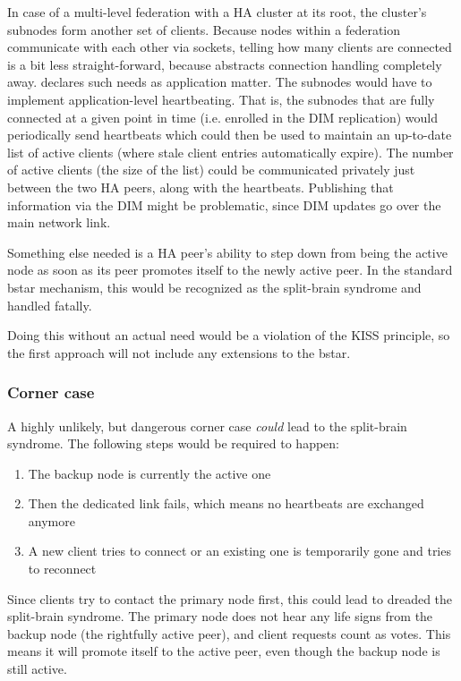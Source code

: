 In case of a multi-level federation with a HA cluster at its root, the
cluster's subnodes form another set of clients. Because nodes within a
federation communicate with each other via \zmq sockets, telling how many
clients are connected is a bit less straight-forward, because \zmq abstracts
connection handling completely away. \zmq declares such needs as application matter.
The subnodes would have to implement application-level heartbeating.
That is, the subnodes that are fully connected at a given point in time (i.e. enrolled
in the DIM replication) would periodically send heartbeats which could then be
used to maintain an up-to-date list of active clients (where stale client
entries automatically expire).  The number of active clients (the size of the
list) could be communicated privately just between the two HA peers, along with
the heartbeats. Publishing that information via the DIM might be problematic,
since DIM updates go over the main network link.

Something else needed is a HA peer's ability to step down from being the
active node as soon as its peer promotes itself to the newly active peer. In
the standard \gls{bstar} mechanism, this would be recognized as the split-brain
syndrome and handled fatally.

Doing this without an actual need would be a violation of the KISS principle,
so the first approach will not include any extensions to the \gls{bstar}.

\subsubsection{Corner case}
A highly unlikely, but dangerous corner case \emph{could} lead to the
split-brain syndrome. The following steps would be required to happen:

\begin{enumerate}
	\item The backup node is currently the active one

	\item Then the dedicated link fails, which means no heartbeats are
		exchanged anymore

	\item A new client tries to connect or an existing one is temporarily
		gone and tries to reconnect
\end{enumerate}

Since clients try to contact the primary node first, this could
lead to dreaded the split-brain syndrome. The primary node does not hear any
life signs from the backup node (the rightfully active peer), and client
requests count as votes. This means it will promote itself to the active peer,
even though the backup node is still active.

